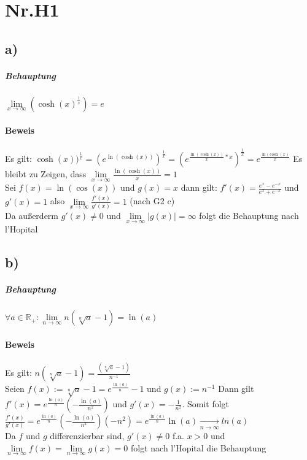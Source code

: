\section*{Nr.H1}
\subsection*{a)}



\subparagraph*{Behauptung}

$\lim\limits_{x \to \infty}(\cosh(x)^{\frac{1}{x}}) = e$

\paragraph*{Beweis}

Es gilt: $\cosh(x))^{\frac{1}{x}} = (e^{\ln(\cosh(x))})^{\frac{1}{x}}
= (e^{\frac {\ln(\cosh(x))}{x}*x})^{\frac{1}{x}} = e^{\frac{\ln(\cosh(x)}{x}}$
Es bleibt zu Zeigen, dass $\lim\limits_{x \to \infty}\frac{\ln(\cosh(x))}{x} = 1 $\\ 
Sei $f(x) = \ln(\cos(x))$ und $g(x)=x$ dann gilt: $f'(x) = \frac{e^{x}-e^{-x}}{e^{x}+e^{-x}} $ und $g'(x) = 1$ also  $\lim\limits_{   x \to \infty} \frac{f'(x)}{g'(x)} = 1 $ (nach G2 c) \\
Da außerderm $g'(x)\neq 0$ und $ \lim\limits_{x\to\infty} |g(x)| = \infty $ folgt die Behauptung nach l'Hopital

\subsection*{b)}

\subparagraph*{Behauptung}

$\forall a\in \mathbb{R}_{+}:\lim\limits_{n \to \infty} n(\sqrt[n]{a}-1) = \ln(a)$

\paragraph*{Beweis}
Es gilt: $n(\sqrt[n]{a}-1) = \frac{(\sqrt[n]{a}-1)}{n^{-1}}$\\
Seien $f(x):= \sqrt[n]{a}-1 = e^{\frac{\ln(a)}{n}}-1$ und $g(x):=n^{-1}$ Dann gilt \\
$f'(x) = e^{\frac{\ln(a)}{n}}(-\frac{\ln(a)}{n^2})$ und $g'(x) = -\frac{1}{n^2}$. Somit folgt \\
$\frac{f'(x)}{g'(x)} = e^{\frac{\ln(a)}{n}}(-\frac{\ln(a)}{n^{2}})(-n^{2}) = e^{\frac{\ln(a)}{n}}\ln(a) \xrightarrow[n \to \infty]{} ln(a)$ \\ Da $f$ und $g$ differenzierbar sind, $g'(x)\neq0 $ f.a. $ x>0$ und $\lim\limits_{n \to \infty} f(x) = \lim\limits_{n \to \infty} g(x) = 0$ folgt nach l'Hopital die Behauptung




